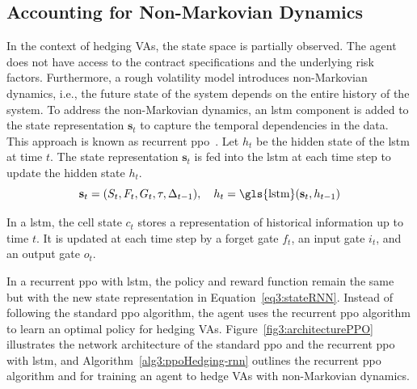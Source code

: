 \subsection{Accounting for Non-Markovian Dynamics}

In the context of hedging VAs, the state space is partially observed.
The agent does not have access to the contract specifications and the underlying risk factors.
Furthermore, a rough volatility model introduces non-Markovian dynamics, i.e., the future state of the system depends on the entire history of the system.
To address the non-Markovian dynamics, an \gls{lstm} component is added to the state representation $\mathbf{s}_t$ to capture the temporal dependencies in the data.
This approach is known as recurrent \gls{ppo}~\citep{ni2021recurrent}.
Let $h_t$ be the hidden state of the \gls{lstm} at time $t$.
The state representation $\mathbf{s}_t$ is fed into the \gls{lstm} at each time step to update the hidden state $h_t$.
\begin{equation} \label{eq3:stateRNN}
    \mathbf{s}_t = (S_t, F_t, G_t, \tau, \Delta_{t-1}), \quad h_t = \text{\gls{lstm}}(\mathbf{s}_t, h_{t-1})
\end{equation}

In a \gls{lstm}, the cell state $c_t$ stores a representation of historical information up to time $t$.
It is updated at each time step by a forget gate $f_t$, an input gate $i_t$, and an output gate $o_t$.

In a recurrent \gls{ppo} with \gls{lstm}, the policy and reward function remain the same but with the new state representation in Equation~\eqref{eq3:stateRNN}.
Instead of following the standard \gls{ppo} algorithm, the agent uses the recurrent \gls{ppo} algorithm to learn an optimal policy for hedging VAs.
Figure~\ref{fig3:architecturePPO} illustrates the network architecture of the standard \gls{ppo} and the recurrent \gls{ppo} with \gls{lstm}, and Algorithm~\ref{alg3:ppoHedging-rnn} outlines the recurrent \gls{ppo} algorithm and for training an agent to hedge VAs with non-Markovian dynamics.

